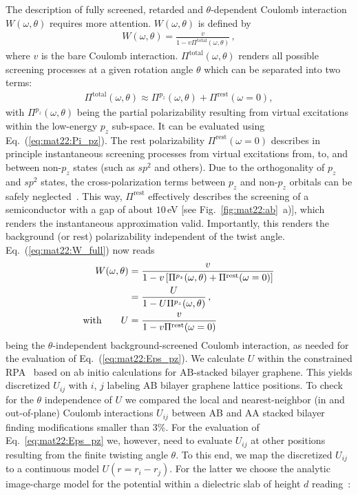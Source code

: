 The description of fully screened, retarded and $\theta$-dependent Coulomb interaction $W(\omega, \theta)$ requires more attention. $W(\omega, \theta)$ is defined by 
\begin{align}\label{eq:mat22:W_full}
    W(\omega, \theta) = \frac{v}{1 - v \Pi^\text{total}(\omega, \theta)} \,,
\end{align}
where $v$ is the bare Coulomb interaction. $\Pi^\text{total}(\omega, \theta)$ renders all possible screening processes at a given rotation angle $\theta$ which can be separated into two terms:
\begin{align*}
     \Pi^\text{total}(\omega, \theta) \approx 
         \Pi^{p_z}(\omega, \theta) + \Pi^\text{rest}(\omega = 0),
\end{align*}
with $\Pi^{p_z}(\omega, \theta)$ being the partial polarizability resulting from virtual excitations within the low-energy $p_z$ sub-space. It can be evaluated using Eq.~(\ref{eq:mat22:Pi_pz}). The rest polarizability $\Pi^\text{rest}(\omega = 0)$ describes in principle instantaneous screening processes from virtual excitations from, to, and between non-$p_z$ states (such as $sp^2$ and others). Due to the orthogonality of $p_z$ and $sp^2$ states, the cross-polarization terms between $p_z$ and non-$p_z$ orbitals can be safely neglected~\cite{van_loon_random_2021}. This way, $\Pi^\text{rest}$ effectively describes the screening of a semiconductor with a gap of about $10\,$eV [see Fig.~\ref{fig:mat22:ab}~a)], which renders the  instantaneous approximation valid. Importantly, this renders the background (or rest) polarizability independent of the twist angle. Eq.~(\ref{eq:mat22:W_full}) now reads
\begin{align*}
    W(\omega, \theta) 
    &= \frac{v}{1 - v \left[\Pi^{p_z}(\omega, \theta) + \Pi^\text{rest}(\omega = 0)\right]}\\
    &= \frac{U}{1 - U \Pi^{p_z}(\omega, \theta)}\,, \notag \\
    \text{with} \qquad U &= \frac{v}{1 - v \Pi^\text{rest}(\omega = 0)}
\end{align*}
being the $\theta$-independent background-screened Coulomb interaction, as needed for the evaluation of Eq.~(\ref{eq:mat22:Eps_pz}). We calculate $U$ within the constrained RPA~\cite{cRPA} based on ab initio calculations for AB-stacked bilayer graphene.%
This yields discretized $U_{ij}$ with $i$, $j$ labeling AB bilayer graphene lattice positions. To check for the $\theta$ independence of $U$ we compared the local and nearest-neighbor (in and out-of-plane) Coulomb interactions $U_{ij}$ between AB and AA stacked bilayer finding modifications smaller than $3\%$. For the evaluation of Eq.~\eqref{eq:mat22:Eps_pz} we, however, need to evaluate $U_{ij}$ at other positions resulting from the finite twisting angle $\theta$. To this end, we map the discretized $U_{ij}$ to a continuous model $U(r = r_i - r_j)$. For the latter we choose the analytic image-charge model for the potential within a dielectric slab of height $d$ reading~\cite{keldysh_coulomb_1979,jena_enhancement_2007,emelyanenko_effect_2008,jiang_plasmonic_2021}:
